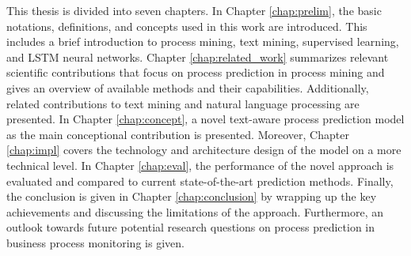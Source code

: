 This thesis is divided into seven chapters.
In Chapter \ref{chap:prelim}, the basic notations, definitions, and concepts used in this work are introduced.
This includes a brief introduction to process mining, text mining, supervised learning, and LSTM neural networks.
Chapter \ref{chap:related_work} summarizes relevant scientific contributions that focus on process prediction in process mining and gives an overview of available methods and their capabilities.
Additionally, related contributions to text mining and natural language processing are presented.
In Chapter \ref{chap:concept}, a novel text-aware process prediction model as the main conceptional contribution is presented.
Moreover, Chapter \ref{chap:impl} covers the technology and architecture design of the model on a more technical level.
In Chapter \ref{chap:eval}, the performance of the novel approach is evaluated and compared to current state-of-the-art prediction methods.
Finally, the conclusion is given in Chapter \ref{chap:conclusion} by wrapping up the key achievements and discussing the limitations of the approach.
Furthermore, an outlook towards future potential research questions on process prediction in business process monitoring is given.